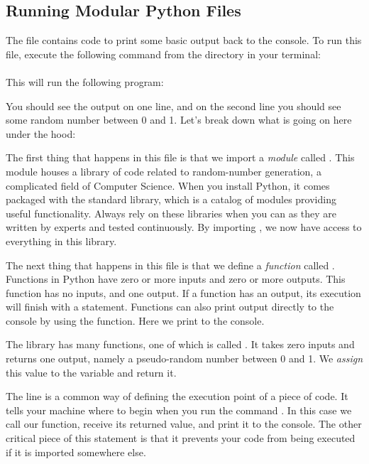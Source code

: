 \subsection{Running Modular Python Files}

The file  contains code to print some basic output back to the console.
To run this file, execute the following command from the  directory in your terminal:\\
\\
This will run the following program:


You should see the output  on one line, and on the second line you should see some random number between 0 and 1.
Let's break down what is going on here under the hood:

The first thing that happens in this file is that we import a \textit{module} called . This module houses a library of code related to random-number generation, a complicated field of Computer Science.
When you install Python, it comes packaged with the standard library, which is a catalog of modules providing useful functionality. Always rely on these libraries when you can as they are written by experts and tested continuously.
By importing , we now have access to everything in this library.

The next thing that happens in this file is that we define a \textit{function} called . Functions in Python have zero or more inputs and zero or more outputs. This function has no inputs, and one output.
If a function has an output, its execution will finish with a  statement.
Functions can also print output directly to the console by using the  function.
Here we print  to the console.

The  library has many functions, one of which is called .
It takes zero inputs and returns one output, namely a pseudo-random number between 0 and 1.
We \textit{assign} this value to the variable  and return it.

The line  is a common way of defining the execution point of a piece of code.
It tells your machine where to begin when you run the command . In this case we call our function, receive its returned value, and print it to the console. The other critical piece of this statement is that it prevents your code from being executed if it is imported somewhere else.

